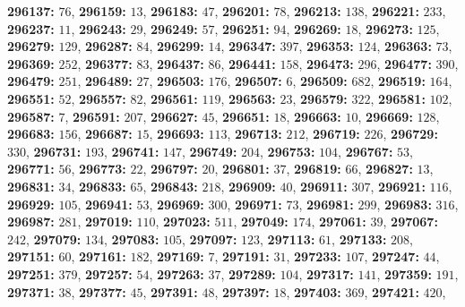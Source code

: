 \textsf{\bfseries 296137:} $76$, \textsf{\bfseries 296159:} $13$, \textsf{\bfseries 296183:} $47$, \textsf{\bfseries 296201:} $78$, \textsf{\bfseries 296213:} $138$, \textsf{\bfseries 296221:} $233$, \textsf{\bfseries 296237:} $11$, \textsf{\bfseries 296243:} $29$, \textsf{\bfseries 296249:} $57$, \textsf{\bfseries 296251:} $94$, \textsf{\bfseries 296269:} $18$, \textsf{\bfseries 296273:} $125$, \textsf{\bfseries 296279:} $129$, \textsf{\bfseries 296287:} $84$, \textsf{\bfseries 296299:} $14$, \textsf{\bfseries 296347:} $397$, \textsf{\bfseries 296353:} $124$, \textsf{\bfseries 296363:} $73$, \textsf{\bfseries 296369:} $252$, \textsf{\bfseries 296377:} $83$, \textsf{\bfseries 296437:} $86$, \textsf{\bfseries 296441:} $158$, \textsf{\bfseries 296473:} $296$, \textsf{\bfseries 296477:} $390$, \textsf{\bfseries 296479:} $251$, \textsf{\bfseries 296489:} $27$, \textsf{\bfseries 296503:} $176$, \textsf{\bfseries 296507:} $6$, \textsf{\bfseries 296509:} $682$, \textsf{\bfseries 296519:} $164$, \textsf{\bfseries 296551:} $52$, \textsf{\bfseries 296557:} $82$, \textsf{\bfseries 296561:} $119$, \textsf{\bfseries 296563:} $23$, \textsf{\bfseries 296579:} $322$, \textsf{\bfseries 296581:} $102$, \textsf{\bfseries 296587:} $7$, \textsf{\bfseries 296591:} $207$, \textsf{\bfseries 296627:} $45$, \textsf{\bfseries 296651:} $18$, \textsf{\bfseries 296663:} $10$, \textsf{\bfseries 296669:} $128$, \textsf{\bfseries 296683:} $156$, \textsf{\bfseries 296687:} $15$, \textsf{\bfseries 296693:} $113$, \textsf{\bfseries 296713:} $212$, \textsf{\bfseries 296719:} $226$, \textsf{\bfseries 296729:} $330$, \textsf{\bfseries 296731:} $193$, \textsf{\bfseries 296741:} $147$, \textsf{\bfseries 296749:} $204$, \textsf{\bfseries 296753:} $104$, \textsf{\bfseries 296767:} $53$, \textsf{\bfseries 296771:} $56$, \textsf{\bfseries 296773:} $22$, \textsf{\bfseries 296797:} $20$, \textsf{\bfseries 296801:} $37$, \textsf{\bfseries 296819:} $66$, \textsf{\bfseries 296827:} $13$, \textsf{\bfseries 296831:} $34$, \textsf{\bfseries 296833:} $65$, \textsf{\bfseries 296843:} $218$, \textsf{\bfseries 296909:} $40$, \textsf{\bfseries 296911:} $307$, \textsf{\bfseries 296921:} $116$, \textsf{\bfseries 296929:} $105$, \textsf{\bfseries 296941:} $53$, \textsf{\bfseries 296969:} $300$, \textsf{\bfseries 296971:} $73$, \textsf{\bfseries 296981:} $299$, \textsf{\bfseries 296983:} $316$, \textsf{\bfseries 296987:} $281$, \textsf{\bfseries 297019:} $110$, \textsf{\bfseries 297023:} $511$, \textsf{\bfseries 297049:} $174$, \textsf{\bfseries 297061:} $39$, \textsf{\bfseries 297067:} $242$, \textsf{\bfseries 297079:} $134$, \textsf{\bfseries 297083:} $105$, \textsf{\bfseries 297097:} $123$, \textsf{\bfseries 297113:} $61$, \textsf{\bfseries 297133:} $208$, \textsf{\bfseries 297151:} $60$, \textsf{\bfseries 297161:} $182$, \textsf{\bfseries 297169:} $7$, \textsf{\bfseries 297191:} $31$, \textsf{\bfseries 297233:} $107$, \textsf{\bfseries 297247:} $44$, \textsf{\bfseries 297251:} $379$, \textsf{\bfseries 297257:} $54$, \textsf{\bfseries 297263:} $37$, \textsf{\bfseries 297289:} $104$, \textsf{\bfseries 297317:} $141$, \textsf{\bfseries 297359:} $191$, \textsf{\bfseries 297371:} $38$, \textsf{\bfseries 297377:} $45$, \textsf{\bfseries 297391:} $48$, \textsf{\bfseries 297397:} $18$, \textsf{\bfseries 297403:} $369$, \textsf{\bfseries 297421:} $420$, 
